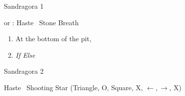\begin{battle}{Sandragora 1}
  \begin{itemize}
    \switch{\tidus}{\kimahri} or \tidus: Haste \kimahri
    \kimahrif \od\ Stone Breath
  \end{itemize}
\end{battle}
\begin{enumerate}[resume]
\item At the bottom of the pit, 
\item \formation{\tidus}{\lulu}{\auron} \textit{If \blitzwin Else} \formation{\tidus}{\rikku}{\auron}
\end{enumerate}
\begin{battle}{Sandragora 2}
  \begin{itemize}
    \tidusf Haste \auron
    \auronf \od\ Shooting Star (Triangle, O, Square, X, $\leftarrow, \rightarrow$, X)
  \end{itemize}
\end{battle}